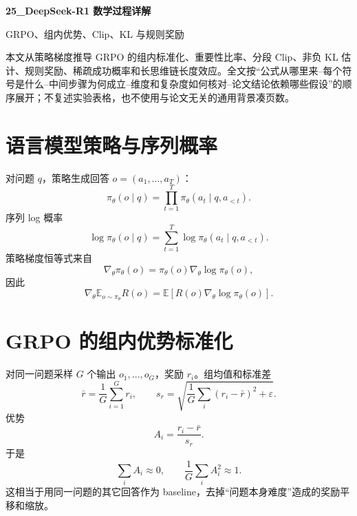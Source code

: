 \documentclass[UTF8,12pt,a4paper,fontset=none]{ctexart}
\numberwithin{equation}{section}
\newcommand{\E}{\mathbb{E}}
\begin{document}
\begin{center}
{\LARGE\bfseries 25\_DeepSeek-R1 数学过程详解}\par
\vspace{0.35em}
{\large GRPO、组内优势、Clip、KL 与规则奖励}
\end{center}
\vspace{0.45em}
\begin{keybox}[本文只处理真正需要推导的部分]
本文从策略梯度推导 GRPO 的组内标准化、重要性比率、分段 Clip、非负 KL 估计、规则奖励、稀疏成功概率和长思维链长度效应。全文按“公式从哪里来--每个符号是什么--中间步骤为何成立--维度和复杂度如何核对--论文结论依赖哪些假设”的顺序展开；不复述实验表格，也不使用与论文无关的通用背景凑页数。
\end{keybox}
\tableofcontents
\newpage

\section{语言模型策略与序列概率}
对问题 $q$，策略生成回答 $o=(a_1,\ldots,a_T)$：
\begin{equation}
 \pi_\theta(o\mid q)=\prod_{t=1}^{T}\pi_\theta(a_t\mid q,a_{<t}).
\end{equation}
序列 log 概率
\begin{equation}
 \log\pi_\theta(o\mid q)=\sum_{t=1}^{T}\log\pi_\theta(a_t\mid q,a_{<t}).
\end{equation}
策略梯度恒等式来自
\begin{equation}
 \nabla_\theta\pi_\theta(o)=\pi_\theta(o)\nabla_\theta\log\pi_\theta(o),
\end{equation}
因此
\begin{equation}
 \nabla_\theta\E_{o\sim\pi_\theta}R(o)
 =\E[R(o)\nabla_\theta\log\pi_\theta(o)].
\end{equation}

\section{GRPO 的组内优势标准化}
对同一问题采样 $G$ 个输出 $o_1,\ldots,o_G$，奖励 $r_i$。组均值和标准差
\begin{equation}
 \bar r=\frac1G\sum_{i=1}^{G}r_i,
 \qquad s_r=\sqrt{\frac1G\sum_i(r_i-\bar r)^2+\varepsilon}.
\end{equation}
优势
\begin{equation}
 \boxed{A_i=\frac{r_i-\bar r}{s_r}}.
\end{equation}
于是
\begin{equation}
 \sum_iA_i\approx0,\qquad \frac1G\sum_iA_i^2\approx1.
\end{equation}
这相当于用同一问题的其它回答作为 baseline，去掉“问题本身难度”造成的奖励平移和缩放。
\end{document}
